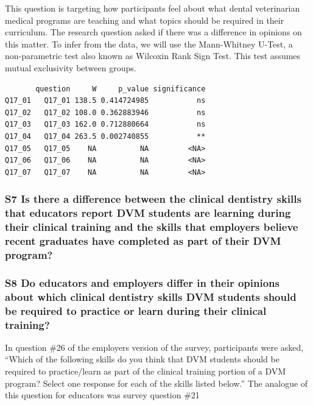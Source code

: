 \documentclass[
  11pt,
  letterpaper,
  DIV=11,
  numbers=noendperiod]{scrartcl}
\begin{document}
This question is targeting how participants feel about what dental
veterinarian medical programs are teaching and what topics should be
required in their curriculum. The research question asked if there was a
difference in opinions on this matter. To infer from the data, we will
use the Mann-Whitney U-Test, a non-parametric test also known as
Wilcoxin Rank Sign Test. This test assumes mutual exclusivity between
groups.

\begin{verbatim}
       question     W     p_value significance
Q17_01   Q17_01 138.5 0.414724985           ns
Q17_02   Q17_02 108.0 0.362883946           ns
Q17_03   Q17_03 162.0 0.712880664           ns
Q17_04   Q17_04 263.5 0.002740855           **
Q17_05   Q17_05    NA          NA         <NA>
Q17_06   Q17_06    NA          NA         <NA>
Q17_07   Q17_07    NA          NA         <NA>
\end{verbatim}

\subsubsection{S7 Is there a difference between the clinical dentistry
skills that educators report DVM students are learning during their
clinical training and the skills that employers believe recent graduates
have completed as part of their DVM
program?}\label{s7-is-there-a-difference-between-the-clinical-dentistry-skills-that-educators-report-dvm-students-are-learning-during-their-clinical-training-and-the-skills-that-employers-believe-recent-graduates-have-completed-as-part-of-their-dvm-program}

\subsubsection{S8 Do educators and employers differ in their opinions
about which clinical dentistry skills DVM students should be required to
practice or learn during their clinical
training?}\label{s8-do-educators-and-employers-differ-in-their-opinions-about-which-clinical-dentistry-skills-dvm-students-should-be-required-to-practice-or-learn-during-their-clinical-training}

In question \#26 of the employers version of the survey, participants
were asked, ``Which of the following skills do you think that DVM
students should be required to practice/learn as part of the clinical
training portion of a DVM program? Select one response for each of the
skills listed below.'' The analogue of this question for educators was
survey question \#21
\end{document}
